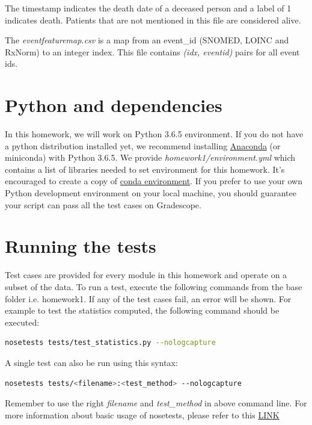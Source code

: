 \documentclass[12pt]{article}
\begin{document}
The timestamp indicates the death date of a deceased person and a label of 1 indicates death. Patients that are not mentioned in this file are considered alive.

The \textit{event\textunderscore feature\textunderscore map.csv} is a map from an event\_id (SNOMED, LOINC and RxNorm) to an integer index. This file contains \textit{(idx, event\textunderscore id)} pairs for all event ids.

\section*{Python and dependencies}
In this homework, we will work on Python 3.6.5 environment. If you do not have a python distribution installed yet, we recommend installing \href{https://docs.continuum.io/anaconda/install}{Anaconda} (or miniconda) with Python 3.6.5. We provide \textit{homework1/environment.yml} which contains a list of libraries needed to set environment
for this homework. It's encouraged to create a copy of \href{https://docs.conda.io/projects/conda/en/latest/user-guide/tasks/manage-environments.html}{conda environment}. If you prefer to use your own Python development environment on your local machine, you should guarantee your script can pass all the test cases on Gradescope.


\section*{Running the tests}
Test cases are provided for every module in this homework and operate on a subset of the data. To run a test, execute the following commands from the base folder i.e. homework1. If any of the test cases fail, an error will be shown. For example to test the statistics computed, the following command should be executed: \\

\begin{lstlisting}[frame=single, language=bash]
nosetests tests/test_statistics.py --nologcapture
\end{lstlisting}

\noindent A single test can also be run using this syntax: \\    
\begin{lstlisting}[frame=single, language=bash]
nosetests tests/<filename>:<test_method> --nologcapture
\end{lstlisting}
Remember to use the right \textit{filename} and \textit{test\_method} in above command line. For more information about basic usage of nosetests, please refer to this \href{https://nose.readthedocs.io/en/latest/usage.html?highlight=#cmdoption--nologcapture}{LINK}
\end{document}
